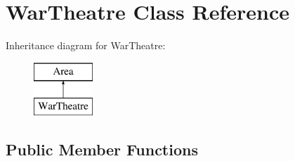 \hypertarget{classWarTheatre}{}\section{War\+Theatre Class Reference}
\label{classWarTheatre}
Inheritance diagram for War\+Theatre\+:\begin{figure}[H]
\begin{center}
\leavevmode
\includegraphics[height=2.000000cm]{classWarTheatre}
\end{center}
\end{figure}
\subsection*{Public Member Functions}
